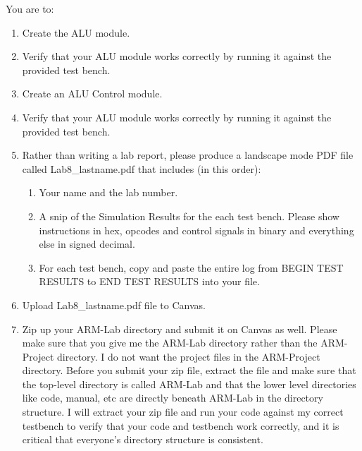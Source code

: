You are to:
\begin{enumerate}
\item Create the ALU module.
\item Verify that your ALU module works correctly by running it against the provided test bench.
\item Create an ALU Control module.
\item Verify that your ALU module works correctly by running it against the provided test bench.
\item Rather than writing a lab report, please produce a landscape mode PDF file called Lab8\_lastname.pdf that includes (in this order):
\begin{enumerate}
	\item Your name and the lab number.
	\item A snip of the Simulation Results for the each test bench.  Please show instructions in hex, opcodes and control signals in binary and everything else in signed decimal.  
	\item For each test bench, copy and paste the entire log from BEGIN TEST RESULTS to END TEST RESULTS into your file.	
\end{enumerate}
\item Upload Lab8\_lastname.pdf file to Canvas.
\item Zip up your ARM-Lab directory and submit it on Canvas as well.  Please make sure that you give me the ARM-Lab directory rather than the ARM-Project directory.  I do not want the project files in the ARM-Project directory.  Before you submit your zip file, extract the file and make sure that the top-level directory is called ARM-Lab and that the lower level directories like code, manual, etc are directly beneath ARM-Lab in the directory structure.  I will extract your zip file and run your code against my correct testbench to verify that your code and testbench work correctly, and it is critical that everyone's directory structure is consistent.
\end{enumerate} 